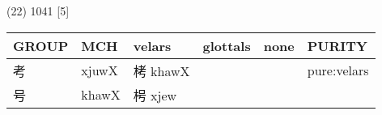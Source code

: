 \documentclass[14pt,a4paper]{scrartcl}
\begin{document}
(22) 1041 {[}5{]}

\begin{longtable}[c]{@{}llllll@{}}
\toprule
\begin{minipage}[b]{0.14\columnwidth}\raggedright\strut
GROUP
\strut\end{minipage} &
\begin{minipage}[b]{0.14\columnwidth}\raggedright\strut
MCH
\strut\end{minipage} &
\begin{minipage}[b]{0.14\columnwidth}\raggedright\strut
velars
\strut\end{minipage} &
\begin{minipage}[b]{0.14\columnwidth}\raggedright\strut
glottals
\strut\end{minipage} &
\begin{minipage}[b]{0.14\columnwidth}\raggedright\strut
none
\strut\end{minipage} &
\begin{minipage}[b]{0.14\columnwidth}\raggedright\strut
PURITY
\strut\end{minipage}\tabularnewline
\midrule
\endhead
\begin{minipage}[t]{0.14\columnwidth}\raggedright\strut
考
\strut\end{minipage} &
\begin{minipage}[t]{0.14\columnwidth}\raggedright\strut
xjuwX
\strut\end{minipage} &
\begin{minipage}[t]{0.14\columnwidth}\raggedright\strut
栲 khawX
\strut\end{minipage} &
\begin{minipage}[t]{0.14\columnwidth}\raggedright\strut
\strut\end{minipage} &
\begin{minipage}[t]{0.14\columnwidth}\raggedright\strut
\strut\end{minipage} &
\begin{minipage}[t]{0.14\columnwidth}\raggedright\strut
pure:velars
\strut\end{minipage}\tabularnewline
\begin{minipage}[t]{0.14\columnwidth}\raggedright\strut
号
\strut\end{minipage} &
\begin{minipage}[t]{0.14\columnwidth}\raggedright\strut
khawX
\strut\end{minipage} &
\begin{minipage}[t]{0.14\columnwidth}\raggedright\strut
枵 xjew
\strut\end{minipage} &

\end{longtable}
\end{document}
